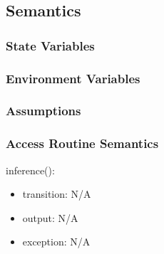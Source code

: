 \documentclass[12pt, titlepage]{article}
\begin{document}
\subsection{Semantics}

\subsubsection{State Variables}


\subsubsection{Environment Variables}


\subsubsection{Assumptions}



\subsubsection{Access Routine Semantics}
\noindent inference():
\begin{itemize}
\item transition: N/A 
\item output: N/A
\item exception: N/A
\end{itemize}
\end{document}
